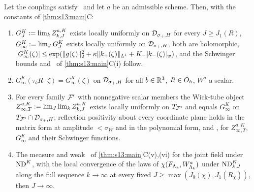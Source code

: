 \begin{proposition}\label{prop:s13:WK}
Let the couplings satisfy \Tthree\ and let $a$ be an admissible scheme. Then, with the constants of \cref{thm:s13:main}C:
\begin{enumerate}[label=\textup{(\alph*)},leftmargin=*,nosep]
\item $G^K_J:=\lim_kZ^{a,K}_{k,J}$ exists locally uniformly on $\mathcal D_{\sigma_+,H}$ for every $J\ge J_1(R)$, $G^K_\infty:=\lim_JG^K_J$ exists locally uniformly on $\mathcal D_{\sigma_+,H}$, both are holomorphic, $|G^K_\infty(\zeta)|\le\exp(\lVert g(\zeta)\rVert_2^2+\kappa\lVert k_+(\zeta)\rVert_{L^1}+K_-\lvert k_-(\zeta)\rvert_{w})$, and the Schwinger bounds and \Ezz\ of \cref{thm:s13:main}C(i) follow.
\item $G^K_\infty(\tau_bR\cdot\zeta)=G^K_\infty(\zeta)$ on $\mathcal D_{\sigma_+,H}$ for all $b\in\mathbb R^3$, $R\in O_h$, $W^a$ a scalar.
\item For every family $\mathcal F'$ with nonnegative scalar members the Wick-tube object $Z^{a,K}_{\infty,T}:=\lim_J\lim_kZ^{a,K}_{k,J}$ exists locally uniformly on $T_{\mathcal F'}$ and equals $G^K_\infty$ on $T_{\mathcal F'}\cap\mathcal D_{\sigma_+,H}$; reflection positivity about every coordinate plane holds in the matrix form at amplitude $<\sigma_W$ and in the polynomial form, and \OSth, for $Z^{a,K}_{\infty,T}$, $G^K_\infty$ and their Schwinger functions.
\item The measure and weak \OSf\ of \cref{thm:s13:main}C(v),(vi) for the joint field under $\mathrm{ND}^{K}$, with the local convergence of the laws of $\chi(F_{\Lambda_k},W^a_{\Lambda_k})$ under $\mathrm{ND}^{K}_{k,J}$ along the full sequence $k\to\infty$ at every fixed $J\ge\max(J_0(\chi),J_1(R_\chi))$, then $J\to\infty$.
\end{enumerate}
\end{proposition}

